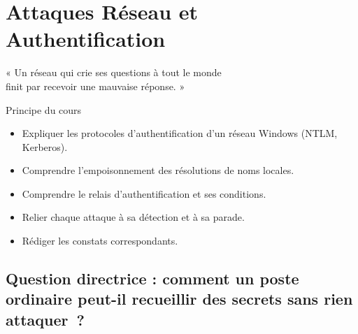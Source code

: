 
\chapter{Attaques Réseau et Authentification}
\label{chap:reseau}

\epigraph{%
    « Un réseau qui crie ses questions à tout le monde\\
    finit par recevoir une mauvaise réponse. »%
}{Principe du cours}


\begin{boxobjectifs}
\begin{itemize}
    \item Expliquer les protocoles d'authentification d'un réseau Windows
          (NTLM, Kerberos).
    \item Comprendre l'empoisonnement des résolutions de noms locales.
    \item Comprendre le relais d'authentification et ses conditions.
    \item Relier chaque attaque à sa détection et à sa parade.
    \item Rédiger les constats correspondants.
\end{itemize}
\end{boxobjectifs}

\bigskip

\section*{Question directrice : comment un poste ordinaire peut-il recueillir des secrets sans rien attaquer~?}

